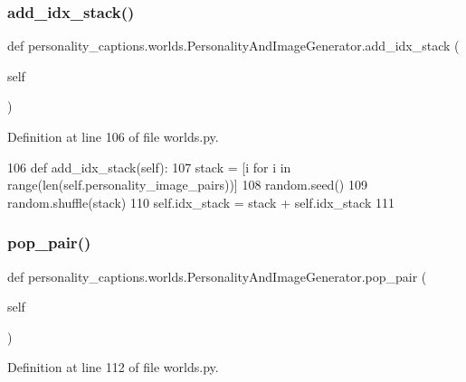 \subsubsection{\texorpdfstring{add\+\_\+idx\+\_\+stack()}{add\_idx\_stack()}}
{\footnotesize\ttfamily def personality\+\_\+captions.\+worlds.\+Personality\+And\+Image\+Generator.\+add\+\_\+idx\+\_\+stack (\begin{DoxyParamCaption}\item[{}]{self }\end{DoxyParamCaption})}



Definition at line 106 of file worlds.\+py.


\begin{DoxyCode}
106     \textcolor{keyword}{def }add\_idx\_stack(self):
107         stack = [i \textcolor{keywordflow}{for} i \textcolor{keywordflow}{in} range(len(self.personality\_image\_pairs))]
108         random.seed()
109         random.shuffle(stack)
110         self.idx\_stack = stack + self.idx\_stack
111 
\end{DoxyCode}
\mbox{\label{classpersonality__captions_1_1worlds_1_1PersonalityAndImageGenerator_ade0cb023a2efc492a3eedea9c670ef51}} 
\subsubsection{\texorpdfstring{pop\+\_\+pair()}{pop\_pair()}}
{\footnotesize\ttfamily def personality\+\_\+captions.\+worlds.\+Personality\+And\+Image\+Generator.\+pop\+\_\+pair (\begin{DoxyParamCaption}\item[{}]{self }\end{DoxyParamCaption})}



Definition at line 112 of file worlds.\+py.


